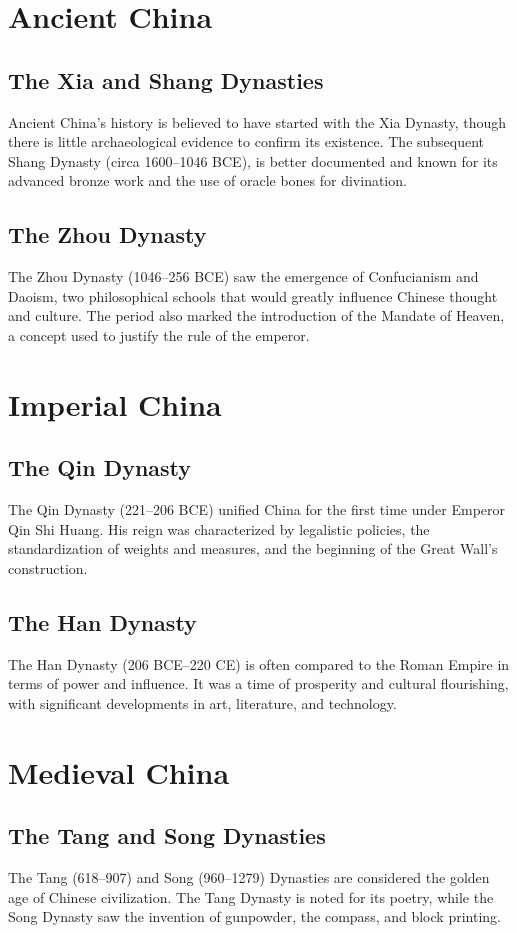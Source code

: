 \documentclass{book}
\begin{document}
\section{Ancient China}
\subsection{The Xia and Shang Dynasties}
Ancient China’s history is believed to have started with the Xia Dynasty, though there is little archaeological evidence to confirm its existence. The subsequent Shang Dynasty (circa 1600–1046 BCE), is better documented and known for its advanced bronze work and the use of oracle bones for divination.

\subsection{The Zhou Dynasty}
The Zhou Dynasty (1046–256 BCE) saw the emergence of Confucianism and Daoism, two philosophical schools that would greatly influence Chinese thought and culture. The period also marked the introduction of the Mandate of Heaven, a concept used to justify the rule of the emperor.

\section{Imperial China}
\subsection{The Qin Dynasty}
The Qin Dynasty (221–206 BCE) unified China for the first time under Emperor Qin Shi Huang. His reign was characterized by legalistic policies, the standardization of weights and measures, and the beginning of the Great Wall’s construction.

\subsection{The Han Dynasty}
The Han Dynasty (206 BCE–220 CE) is often compared to the Roman Empire in terms of power and influence. It was a time of prosperity and cultural flourishing, with significant developments in art, literature, and technology.

\section{Medieval China}
\subsection{The Tang and Song Dynasties}
The Tang (618–907) and Song (960–1279) Dynasties are considered the golden age of Chinese civilization. The Tang Dynasty is noted for its poetry, while the Song Dynasty saw the invention of gunpowder, the compass, and block printing.
\end{document}
